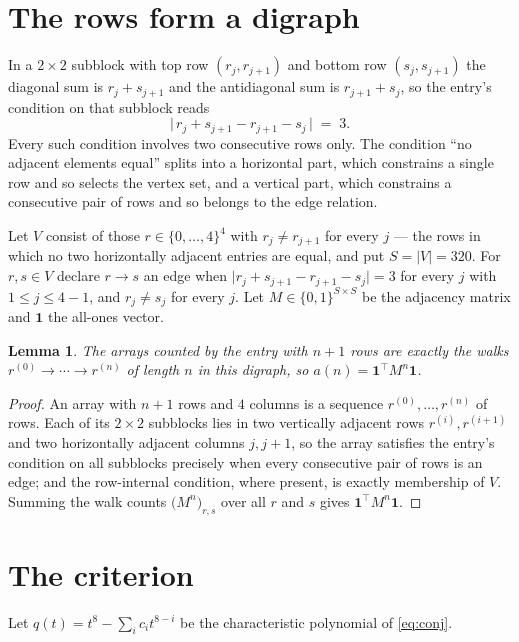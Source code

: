 \documentclass[11pt,a4paper]{article}
\theoremstyle{plain}
\newtheorem{lemma}[theorem]{Lemma}
\theoremstyle{definition}
\begin{document}
\section{The rows form a digraph}

In a $2\times2$ subblock with top row $(r_j,r_{j+1})$ and bottom row $(s_j,s_{j+1})$ the
diagonal sum is $r_j+s_{j+1}$ and the antidiagonal sum is $r_{j+1}+s_j$, so the entry's
condition on that subblock reads
\[
\bigl|\,r_j+s_{j+1}-r_{j+1}-s_j\,\bigr|\;=\;3.
\]
Every such condition involves two consecutive rows only. The condition ``no adjacent elements equal'' splits into a horizontal
part, which constrains a single row and so selects the vertex set, and a vertical part,
which constrains a consecutive pair of rows and so belongs to the edge relation.

Let $V$ consist of those $r\in\{0,\dots,4\}^{4}$ with $r_j\ne r_{j+1}$ for every
$j$ --- the rows in which no two horizontally adjacent entries are equal, and put $S=|V|=320$. For $r,s\in V$ declare $r\to s$ an edge
when $\bigl|r_j+s_{j+1}-r_{j+1}-s_j\bigr|=3$ for every $j$ with
$1\le j\le4-1$, and $r_j\ne s_j$ for every $j$. Let $M\in\{0,1\}^{S\times S}$ be the adjacency matrix and $\mathbf{1}$
the all-ones vector.

\begin{lemma}\label{lem:walk}
The arrays counted by the entry with $n+1$ rows are exactly the walks
$r^{(0)}\to\cdots\to r^{(n)}$ of length $n$ in this digraph, so
$a(n)=\mathbf{1}^{\!\top}M^{n}\mathbf{1}$.
\end{lemma}

\begin{proof}
An array with $n+1$ rows and $4$ columns is a sequence $r^{(0)},\dots,r^{(n)}$ of
rows. Each of its $2\times2$ subblocks lies in two vertically adjacent rows
$r^{(i)},r^{(i+1)}$ and two horizontally adjacent columns $j,j+1$, so the array satisfies
the entry's condition on all subblocks precisely when every consecutive pair of rows is an
edge; and the row-internal condition, where present, is exactly membership of $V$. Summing
the walk counts $\bigl(M^{n}\bigr)_{r,s}$ over all $r$ and $s$ gives
$\mathbf{1}^{\!\top}M^{n}\mathbf{1}$.
\end{proof}

\section{The criterion}

Let $q(t)=t^{8}-\sum_i c_i t^{8-i}$ be the characteristic polynomial of
\eqref{eq:conj}.
\end{document}
